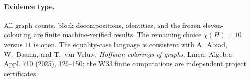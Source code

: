 \paragraph{Evidence type.}
All graph counts, block decompositions, identities, and the frozen eleven-colouring are finite machine-verified results.  The remaining choice $\chi(H)=10$ versus $11$ is open.  The equality-case language is consistent with A.~Abiad, W.~Bosma, and T.~van Veluw, \emph{Hoffman colorings of graphs}, Linear Algebra Appl. 710 (2025), 129--150; the W33 finite computations are independent project certificates.
